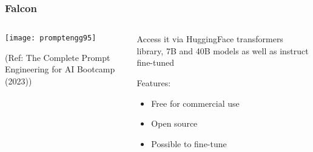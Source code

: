 








\begin{frame}[fragile]\frametitle{Falcon}


\begin{columns}
    \begin{column}[T]{0.6\linewidth}
		\begin{center}
		\texttt{[image: promptengg95]}

		{\tiny (Ref: The Complete Prompt Engineering for AI Bootcamp (2023))}
		\end{center}	
    \end{column}
    \begin{column}[T]{0.4\linewidth}
		Access it via HuggingFace transformers library, 
		7B and 40B models as well as instruct fine-tuned
		
		Features:
		\begin{itemize}
		\item Free for commercial use
		\item Open source
		\item Possible to fine-tune
		\end{itemize}	 

    \end{column}
  \end{columns}
\end{frame}



